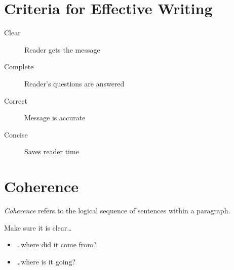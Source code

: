 \documentclass[10pt,a4paper,twocolumn]{scrartcl}
\title{\doctitle}
\author{}
\date{}
\begin{document}
\maketitle

\section{Criteria for Effective Writing}
\begin{description}
    \item[Clear] Reader gets the message
    \item[Complete] Reader's questions are answered
    \item[Correct] Message is accurate
    \item[Concise] Saves reader time
\end{description}

\section{Coherence}
\emph{Coherence} refers to the logical sequence of sentences within a paragraph. 

Make sure it is clear\dots
\begin{itemize}
    \item \dots where did it come from?
    \item \dots where is it going?
\end{itemize}
\end{document}
